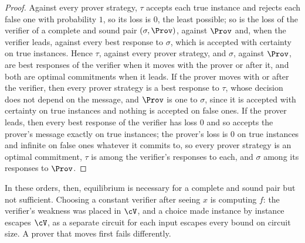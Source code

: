 \begin{refsection}
\begin{proof}
Against every prover strategy, $\tau$ accepts each true instance and rejects each false one with probability $1$, so its loss is $0$, the least possible; so is the loss of the verifier of a complete and sound pair $(\sigma,\Prov)$, against $\Prov$ and, when the verifier leads, against every best response to $\sigma$, which is accepted with certainty on true instances. Hence $\tau$, against every prover strategy, and $\sigma$, against $\Prov$, are best responses of the verifier when it moves with the prover or after it, and both are optimal commitments when it leads. If the prover moves with or after the verifier, then every prover strategy is a best response to $\tau$, whose decision does not depend on the message, and $\Prov$ is one to $\sigma$, since it is accepted with certainty on true instances and nothing is accepted on false ones. If the prover leads, then every best response of the verifier has loss $0$ and so accepts the prover's message exactly on true instances; the prover's loss is $0$ on true instances and infinite on false ones whatever it commits to, so every prover strategy is an optimal commitment, $\tau$ is among the verifier's responses to each, and $\sigma$ among its responses to $\Prov$.
\end{proof}

In these orders, then, equilibrium is necessary for a complete and sound pair but not sufficient. Choosing a constant verifier after seeing $x$ is computing $f$: the verifier's weakness was placed in $\cV$, and a choice made instance by instance escapes $\cV$, as a separate circuit for each input escapes every bound on circuit size. A prover that moves first fails differently.



\end{refsection}
